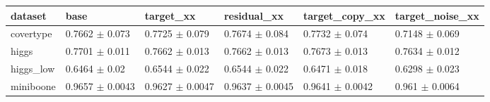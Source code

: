 \begin{tabular}{llllll}
\toprule
dataset & base & target\_xx & residual\_xx & target\_copy\_xx & target\_noise\_xx \\
\midrule
covertype & 0.7662 $\pm$ 0.073 & 0.7725 $\pm$ 0.079 & 0.7674 $\pm$ 0.084 & 0.7732 $\pm$ 0.074 & 0.7148 $\pm$ 0.069 \\
higgs & 0.7701 $\pm$ 0.011 & 0.7662 $\pm$ 0.013 & 0.7662 $\pm$ 0.013 & 0.7673 $\pm$ 0.013 & 0.7634 $\pm$ 0.012 \\
higgs\_low & 0.6464 $\pm$ 0.02 & 0.6544 $\pm$ 0.022 & 0.6544 $\pm$ 0.022 & 0.6471 $\pm$ 0.018 & 0.6298 $\pm$ 0.023 \\
miniboone & 0.9657 $\pm$ 0.0043 & 0.9627 $\pm$ 0.0047 & 0.9637 $\pm$ 0.0045 & 0.9641 $\pm$ 0.0042 & 0.961 $\pm$ 0.0064 \\
\bottomrule
\end{tabular}
